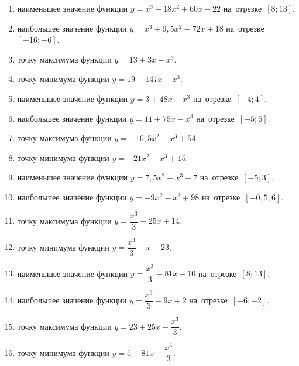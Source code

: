 \documentclass[a4paper,10pt]{article}
\begin{document}
\begin{enumerate}
\item {} наименьшее значение функции $y=x^3 -18x^2+60x-22$ на~отрезке~$\left[8;13\right]$.

\item {} наибольшее значение функции $y=x^3 +9,5x^2-72x+18$ на~отрезке~$\left[-16;-6\right]$.

\item {} точку максимума функции $y=13+3x-x^3$.

\item {} точку минимума функции $y=19+147x-x^3$.

\item {} наименьшее значение функции $y=3+48x-x^3$ на~отрезке~$\left[-4;4\right]$.

\item {} наибольшее значение функции $y=11+75x-x^3$ на~отрезке~$\left[-5;5\right]$.

\item {} точку максимума функции $y=-16,5x^2-x^3+54$.

\item {} точку минимума функции $y=-21x^2-x^3+15$.

\item {} наименьшее значение функции $y=7,5x^2-x^3+7$ на~отрезке~$\left[-5;3\right]$.

\item {} наибольшее значение функции $y=-9x^2-x^3+98$ на~отрезке~$\left[-0,5;6\right]$.

\item {} точку максимума функции $y=\dfrac{x^3}{3} -25x+14$.

\item {} точку минимума функции $y=\dfrac{x^3}{3} -x+23$.

\item {} наименьшее значение функции $y=\dfrac{x^3}{3} -81x-10$ на~отрезке~$\left[8;13\right]$.

\item {} наибольшее значение функции $y=\dfrac{x^3}{3} -9x+2$ на~отрезке~$\left[-6;-2\right]$.

\item {} точку максимума функции $y=23 +25x-\dfrac{x^3}{3}$.

\item {} точку минимума функции $y=5 +81x-\dfrac{x^3}{3}$.


\end{enumerate}
\end{document}
